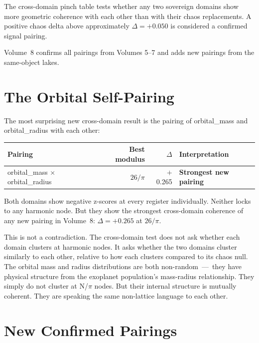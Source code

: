 \documentclass[11pt, letterpaper, openany]{book}
\begin{document}
The cross-domain pinch table tests whether any two sovereign domains show more
geometric coherence with each other than with their chaos replacements. A positive
chaos delta above approximately $\Delta = +0.050$ is considered a confirmed signal
pairing.

Volume~8 confirms all pairings from Volumes 5--7 and adds new pairings from the
same-object lakes.

\section{The Orbital Self-Pairing}

The most surprising new cross-domain result is the pairing of orbital\_mass and
orbital\_radius with each other:

\begin{table}[H]
\centering
\begin{tabular}{|l|r|r|l|}
\hline
\rowcolor{kishblue!10}
\textbf{Pairing} & \textbf{Best modulus} & \textbf{$\Delta$} & \textbf{Interpretation} \\
\hline\hline
orbital\_mass $\times$ orbital\_radius & $26/\pi$ & $+$0.265 & \textbf{Strongest new pairing} \\
\hline
\end{tabular}
\end{table}

Both domains show negative z-scores at every register individually. Neither locks
to any harmonic node. But they show the strongest cross-domain coherence of any new
pairing in Volume~8: $\Delta = +0.265$ at $26/\pi$.

This is not a contradiction. The cross-domain test does not ask whether each domain
clusters at harmonic nodes. It asks whether the two domains cluster similarly to
each other, relative to how each clusters compared to its chaos null. The orbital
mass and radius distributions are both non-random~---~they have physical structure
from the exoplanet population's mass-radius relationship. They simply do not cluster
at N/$\pi$ nodes. But their internal structure is mutually coherent. They are
speaking the same non-lattice language to each other.

\section{New Confirmed Pairings}
\end{document}
